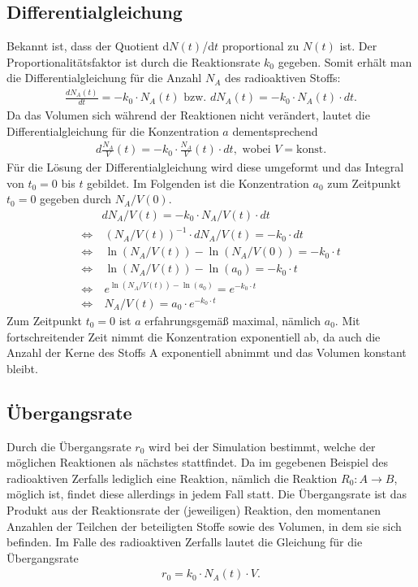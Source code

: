 \documentclass{scrartcl}
\begin{document}
\subsection{Differentialgleichung}
Bekannt ist, dass der Quotient d$N(t)$/d$t$ proportional zu $N(t)$ ist. Der Proportionalitätsfaktor ist durch die Reaktionsrate $k_0$ gegeben. Somit erhält man die Differentialgleichung für die Anzahl $N_A$ des radioaktiven Stoffs:
\begin{align*}
    \frac{dN_A(t)}{dt} = -k_0 \cdot N_A(t) \text{ bzw. } dN_A(t) = -k_0 \cdot N_A(t) \cdot dt.
\end{align*}
Da das Volumen sich während der Reaktionen nicht verändert, lautet die Differentialgleichung für die Konzentration $a$ dementsprechend
\begin{align*}
    d\frac{N_A}{V}(t) = -k_0 \cdot \frac{N_{A}}{V}(t) \cdot dt, \text{ wobei } V = \text{konst.} %
\end{align*}
Für die Lösung der Differentialgleichung wird diese umgeformt und das Integral von $t_0=0$ bis $t$ gebildet. Im Folgenden ist die Konzentration $a_0$ zum Zeitpunkt $t_0 = 0$ gegeben durch $N_A/V(0)$.
\begin{align*}
    & dN_A/V(t) = -k_0 \cdot N_{A}/V(t) \cdot dt \\
    \Leftrightarrow &~ (N_A/V(t))^{-1} \cdot dN_A/V(t) = -k_0 \cdot dt \\
    \Leftrightarrow &~ \ln (N_A/V(t)) - \ln (N_A/V(0)) = -k_0 \cdot t \\
    \Leftrightarrow &~ \ln(N_A/V(t)) - \ln(a_0) = -k_0 \cdot t \\
    \Leftrightarrow &~ e^{\ln(N_A/V(t)) - \ln(a_0)} = e^{-k_0 \cdot t} \\
    \Leftrightarrow &~ N_A/V(t) = a_0 \cdot e^{-k_0 \cdot t}
\end{align*}
Zum Zeitpunkt $t_0=0$ ist $a$ erfahrungsgemäß maximal, nämlich $a_0$. Mit fortschreitender Zeit nimmt die Konzentration exponentiell ab, da auch die Anzahl der Kerne des Stoffs A exponentiell abnimmt und das Volumen konstant bleibt.

\subsection{Übergangsrate}
Durch die Übergangsrate $r_0$ wird bei der Simulation bestimmt, welche der möglichen Reaktionen als nächstes stattfindet. Da im gegebenen Beispiel des radioaktiven Zerfalls lediglich eine Reaktion, nämlich die Reaktion $R_0: A \rightarrow B$, möglich ist, findet diese allerdings in jedem Fall statt. Die Übergangsrate ist das Produkt aus der Reaktionsrate der (jeweiligen) Reaktion, den momentanen Anzahlen der Teilchen der beteiligten Stoffe sowie des Volumen, in dem sie sich befinden. Im Falle des radioaktiven Zerfalls lautet die Gleichung für die Übergangsrate
\begin{align}
    r_0 = k_0 \cdot N_A(t) \cdot V.
\end{align}
\end{document}

